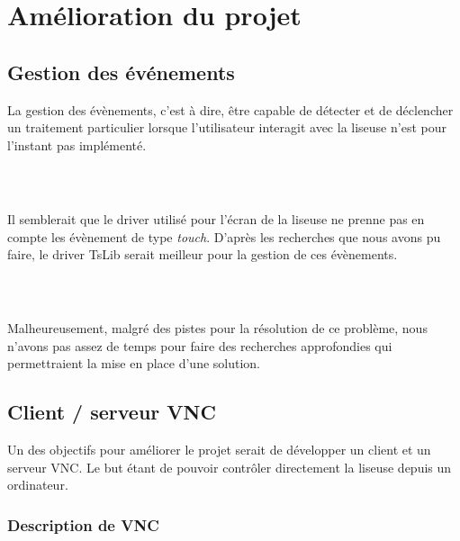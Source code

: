 \chapter{Amélioration du projet}





\section{Gestion des événements}
La gestion des évènements, c'est à dire, être capable de détecter et de déclencher un traitement particulier lorsque l'utilisateur interagit avec la liseuse n'est pour l'instant pas implémenté.
\paragraph*{~}
Il semblerait que le driver utilisé pour l'écran de la liseuse ne prenne pas en compte les évènement de type \emph{touch}. D'après les recherches que nous avons pu faire, le driver TsLib serait meilleur pour la gestion de ces évènements.
\paragraph*{~}
Malheureusement, malgré des pistes pour la résolution de ce problème, nous n'avons pas assez de temps pour faire des recherches approfondies qui permettraient la mise en place d'une solution.


\section{Client / serveur VNC}

Un des objectifs pour améliorer le projet serait de développer un client et un serveur VNC. Le but étant de pouvoir contrôler directement la liseuse depuis un ordinateur.

\subsection{Description de VNC}

